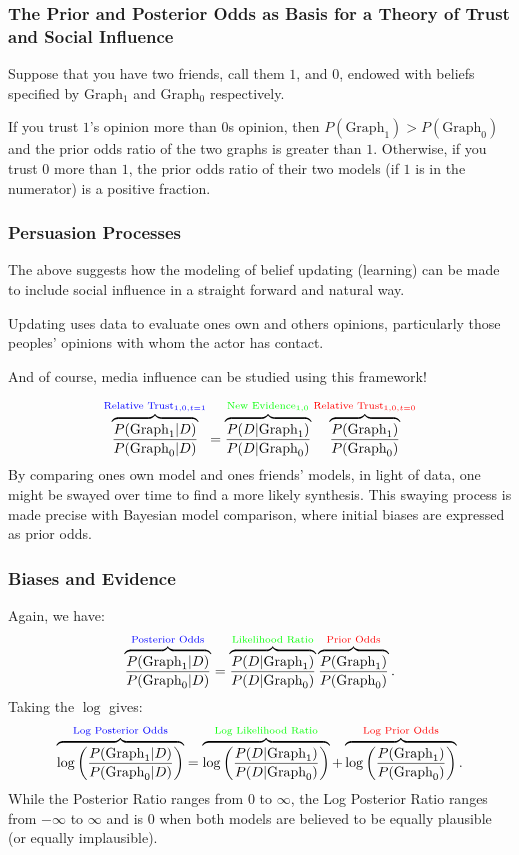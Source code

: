 \documentclass{beamer}
\begin{document}
\begin{frame}
\frametitle{The Prior and Posterior Odds as Basis for a Theory of Trust and Social Influence}
Suppose that you have two friends, call them $1$, and $0$, endowed with beliefs specified by Graph$_1$ and Graph$_0$ respectively.

If you trust $1$'s opinion more than $0$s opinion, then $P(\text{Graph}_1)>P(\text{Graph}_0)$ and the prior odds ratio of the two graphs is greater than $1$. Otherwise, if you trust $0$ more than $1$, the prior odds ratio of their two models (if $1$ is in the numerator) is a positive fraction.
\end{frame}

\begin{frame}
\frametitle{Persuasion Processes}
The above suggests how the modeling of belief updating (learning) can be made to include social influence in a straight forward and natural way.

Updating uses data to evaluate ones own and others opinions, particularly those peoples' opinions with whom the actor has contact.

And of course, media influence can be studied using this framework!

$$\overbrace{\frac{P(\text{Graph}_1 | D)}{P(\text{Graph}_0 | D)}}^\text{\textcolor{blue}{Relative Trust$_{1, 0, t=1}$}} = \overbrace{\frac{P(D | \text{Graph}_1)}{P(D | \text{Graph}_0)}}^\text{\textcolor{green}{New Evidence$_{1, 0}$}} \overbrace{\frac{P(\text{Graph}_1)}{P(\text{Graph}_0)}}^\text{\textcolor{red}{Relative Trust$_{1, 0, t=0}$}}$$
By comparing ones own model and ones friends' models, in light of data, one might be swayed over time to find a more likely synthesis. This swaying process is made precise with Bayesian model comparison, where initial biases are expressed as prior odds.
\end{frame}
\begin{frame}
\frametitle{Biases and Evidence}
Again, we have:
$$\overbrace{\frac{P(\text{Graph}_1 | D)}{P(\text{Graph}_0 | D)}}^\text{\textcolor{blue}{Posterior Odds}} = \overbrace{\frac{P(D | \text{Graph}_1)}{P(D | \text{Graph}_0)}}^\text{\textcolor{green}{Likelihood Ratio}} \overbrace{\frac{P(\text{Graph}_1)}{P(\text{Graph}_0)}}^\text{\textcolor{red}{Prior Odds}}.$$
Taking the $\log$ gives:
$$\overbrace{\log\left(\frac{P(\text{Graph}_1 | D)}{P(\text{Graph}_0 | D)}\right)}^\text{\textcolor{blue}{Log Posterior Odds}} = \overbrace{\log\left(\frac{P(D | \text{Graph}_1)}{P(D | \text{Graph}_0)}\right)}^\text{\textcolor{green}{Log Likelihood Ratio}} + \overbrace{\log\left(\frac{P(\text{Graph}_1)}{P(\text{Graph}_0)}\right)}^\text{\textcolor{red}{Log Prior Odds}}.$$
While the Posterior Ratio ranges from $0$ to $\infty$, the Log Posterior Ratio ranges from $-\infty$ to $\infty$ and is $0$ when both models are believed to be equally plausible (or equally implausible).
\end{frame}
\end{document}
